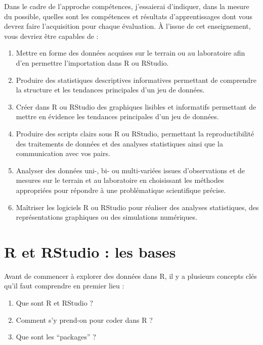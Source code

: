 \documentclass[a4paperpaper,]{article}
\providecommand{\tightlist}{%
  \setlength{\itemsep}{0pt}\setlength{\parskip}{0pt}}
\begin{document}
\begin{enumerate}
\end{enumerate}

Dans le cadre de l'approche compétences, j'essaierai d'indiquer, dans la mesure du possible, quelles sont les compétences et résultats d'apprentissages dont vous devrez faire l'acquisition pour chaque évaluation. À l'issue de cet enseignement, vous devriez être capables de :

\begin{enumerate}
\def\labelenumi{\arabic{enumi}.}
\tightlist
\item
  Mettre en forme des données acquises sur le terrain ou au laboratoire afin d'en permettre l'importation dans R ou RStudio.
\item
  Produire des statistiques descriptives informatives permettant de comprendre la structure et les tendances principales d'un jeu de données.
\item
  Créer dans R ou RStudio des graphiques lisibles et informatifs permettant de mettre en évidence les tendances principales d'un jeu de données.
\item
  Produire des scripts clairs sous R ou RStudio, permettant la reproductibilité des traitements de données et des analyses statistiques ainsi que la communication avec vos pairs.
\item
  Analyser des données uni-, bi- ou multi-variées issues d'observations et de mesures sur le terrain et au laboratoire en choisissant les méthodes appropriées pour répondre à une problématique scientifique précise.
\item
  Maîtriser les logiciels R ou RStudio pour réaliser des analyses statistiques, des représentations graphiques ou des simulations numériques.
\end{enumerate}

\hypertarget{bases}{%
\section{R et RStudio : les bases}\label{bases}}

Avant de commencer à explorer des données dans R, il y a plusieurs concepts clés qu'il faut comprendre en premier lieu :

\begin{enumerate}
\def\labelenumi{\arabic{enumi}.}
\tightlist
\item
  Que sont R et RStudio ?
\item
  Comment s'y prend-on pour coder dans R ?
\item
  Que sont les ``packages'' ?
\end{enumerate}
\end{document}
